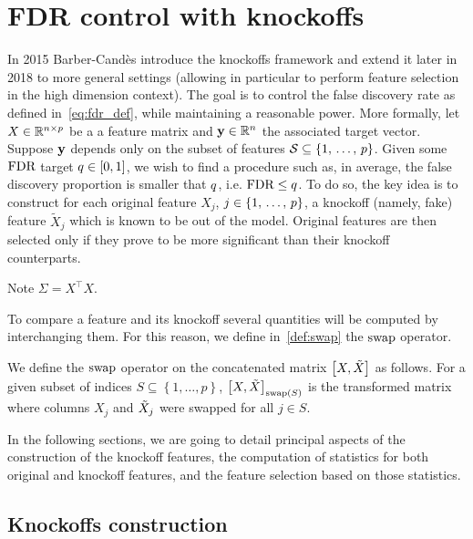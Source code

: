 
\FloatBarrier
\section{FDR control with knockoffs}\label{sec:knockoffs}

In 2015 Barber-Candès introduce the knockoffs framework and extend it later in 2018 to more general settings
(allowing in particular to perform feature selection in the high dimension context).
The goal is to control the false discovery rate as defined in~\ref{eq:fdr_def}, while maintaining a reasonable power.
More formally, let $X \in \mathbb{R}^{n \times p}$ be a a feature matrix and $\mathbf{y} \in \mathbb{R}^n$ the associated target vector.
Suppose $\mathbf{y}$ depends only on the subset of features $\mathcal{S} \subseteq \left\{ 1,\, \dots,\, p \right\}$.
Given some $\text{FDR}$ target $q \in [0, 1]$, we wish to find a procedure such as, in average,
the false discovery proportion is smaller that $q$, i.e. $\text{FDR} \leq q$.
To do so, the key idea is to construct for each original feature $X_j$, $j \in \left\{ 1,\, \dots,\, p \right\}$,
a knockoff (namely, fake) feature $\tilde{X}_j$ which is known to be out of the model.
Original features are then selected only if they prove to be more significant than their knockoff counterparts.

Note $\Sigma = X^\top X$.

To compare a feature and its knockoff several quantities will be computed by interchanging them.
For this reason, we define in~\ref{def:swap} the $\operatorname{swap}$ operator.
\begin{definition}\label{def:swap}
        We define the $\operatorname{swap}$ operator on the concatenated matrix $\big[ X, \tilde{X} \big]$ as follows.
        For a given subset of indices $S \subseteq \left\{ 1, \dots, p \right\}$,
        $\big[ X, \tilde{X} \big]_{\operatorname{swap}(S)}$ is the transformed matrix where columns $X_j$ and $\tilde{X}_j$ were swapped for all
        $j \in S$.
\end{definition}

In the following sections, we are going to detail principal aspects of the construction of the knockoff features,
the computation of statistics for both original and knockoff features,
and the feature selection based on those statistics.
%
\subsection{Knockoffs construction}\label{subsec:kc}

